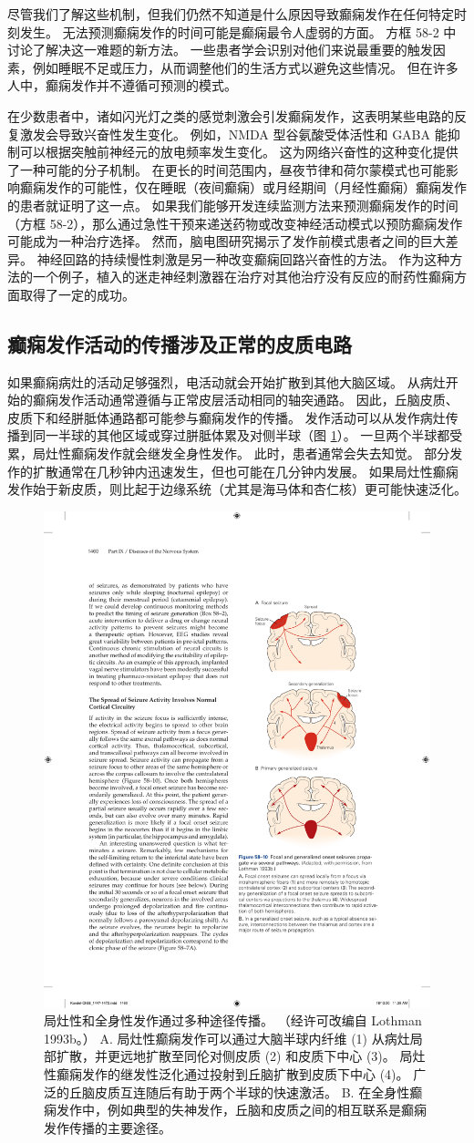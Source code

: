 尽管我们了解这些机制，但我们仍然不知道是什么原因导致癫痫发作在任何特定时刻发生。 无法预测癫痫发作的时间可能是癫痫最令人虚弱的方面。 方框 58-2 中讨论了解决这一难题的新方法。 一些患者学会识别对他们来说最重要的触发因素，例如睡眠不足或压力，从而调整他们的生活方式以避免这些情况。 但在许多人中，癫痫发作并不遵循可预测的模式。

在少数患者中，诸如闪光灯之类的感觉刺激会引发癫痫发作，这表明某些电路的反复激发会导致兴奋性发生变化。 例如，NMDA 型谷氨酸受体活性和 GABA 能抑制可以根据突触前神经元的放电频率发生变化。 这为网络兴奋性的这种变化提供了一种可能的分子机制。 在更长的时间范围内，昼夜节律和荷尔蒙模式也可能影响癫痫发作的可能性，仅在睡眠（夜间癫痫）或月经期间（月经性癫痫）癫痫发作的患者就证明了这一点。 如果我们能够开发连续监测方法来预测癫痫发作的时间（方框 58-2），那么通过急性干预来递送药物或改变神经活动模式以预防癫痫发作可能成为一种治疗选择。 然而，脑电图研究揭示了发作前模式患者之间的巨大差异。 神经回路的持续慢性刺激是另一种改变癫痫回路兴奋性的方法。 作为这种方法的一个例子，植入的迷走神经刺激器在治疗对其他治疗没有反应的耐药性癫痫方面取得了一定的成功。

\subsection{癫痫发作活动的传播涉及正常的皮质电路}
如果癫痫病灶的活动足够强烈，电活动就会开始扩散到其他大脑区域。 从病灶开始的癫痫发作活动通常遵循与正常皮层活动相同的轴突通路。 因此，丘脑皮质、皮质下和经胼胝体通路都可能参与癫痫发作的传播。 发作活动可以从发作病灶传播到同一半球的其他区域或穿过胼胝体累及对侧半球（图 \ref{fig:58_10}）。 一旦两个半球都受累，局灶性癫痫发作就会继发全身性发作。 此时，患者通常会失去知觉。 部分发作的扩散通常在几秒钟内迅速发生，但也可能在几分钟内发展。 如果局灶性癫痫发作始于新皮质，则比起于边缘系统（尤其是海马体和杏仁核）更可能快速泛化。

\begin{figure}[htbp]
	\centering
	\includegraphics[width=0.4\linewidth]{chap58/fig_58_10}
	\caption{局灶性和全身性发作通过多种途径传播。 （经许可改编自 Lothman 1993b。） A. 局灶性癫痫发作可以通过大脑半球内纤维 (1) 从病灶局部扩散，并更远地扩散至同伦对侧皮质 (2) 和皮质下中心 (3)。 局灶性癫痫发作的继发性泛化通过投射到丘脑扩散到皮质下中心 (4)。 广泛的丘脑皮质互连随后有助于两个半球的快速激活。 B. 在全身性癫痫发作中，例如典型的失神发作，丘脑和皮质之间的相互联系是癫痫发作传播的主要途径。}
	\label{fig:58_10}
\end{figure}

